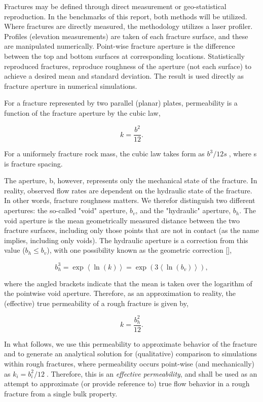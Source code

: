 Fractures may be defined through direct measurement or geo-statistical reproduction. In the benchmarks of this report, both methods will be utilized. Where fractures are directly measured, the methodology utilizes a laser profiler. Profiles (elevation measurements) are taken of each fracture surface, and these are manipulated numerically. Point-wise fracture aperture is the difference between the top and bottom surfaces at corresponding locations. Statistically reproduced fractures, reproduce roughness of the aperture (not each surface) to achieve a desired mean and standard deviation. The result is used directly as fracture aperture in numerical simulations.

For a fracture represented by two parallel (planar) plates, permeability is a function of the fracture aperture by the cubic law,

\[k=\frac{b^{2}}{12}.\]

For a uniformely fracture rock mass, the cubic law takes form as ${{{b}^{3}}}/{12s}\;$, where s is fracture spacing. 

The aperture, b, however, represents only the mechanical state of the fracture. In reality, observed flow rates are dependent on the hydraulic state of the fracture. In other words, fracture roughness matters. We therefor distinguish two different apertures: the so-called "void" aperture, ${{b}_{v}}$, and the "hydraulic" aperture, ${{b}_{h}}$. The void aperture is the mean geometrically measured distance between the two fracture surfaces, including only those points that are not in contact (as the name implies, including only voids). The hydraulic aperture is a correction from this value (${{b}_{h}}\le {{b}_{v}}$), with one possibility known as the geometric correction [\cite{piggott2003}],

\[b_{h}^{3}=\exp \left\langle \ln \left( k \right) \right\rangle =\exp \left( 3\left\langle \ln \left( {{b}_{v}} \right) \right\rangle  \right),\]

where the angled brackets indicate that the mean is taken over the logarithm of the pointwise void aperture. Therefore, as an approximation to reality, the (effective) true permeability of a rough fracture is given by,

\[k=\frac{b_{h}^{2}}{12}.\]

In what follows, we use this permeability to approximate behavior of the fracture and to generate an analytical solution for (qualitative) comparison to simulations within rough fractures, where permeability occurs point-wise (and mechanically) as ${k_{i}=b_{i}^{2}}/{12}\;$. Therefore, this is an \emph{effective permeability}, and shall be used as an attempt to approximate (or provide reference to) true flow behavior in a rough fracture from a single bulk property.

